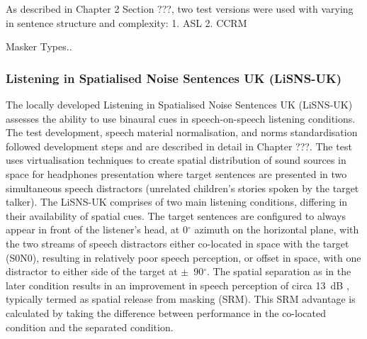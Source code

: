 \documentclass[a4paper, twoside]{templates/ociamthesis}
\begin{document}
As described in Chapter 2 Section ???, two test versions were used with varying in sentence structure and complexity: 1. ASL 2. CCRM

Masker Types..

\hypertarget{listening-in-spatialised-noise-sentences-uk-lisns-uk}{%
\subsubsection{Listening in Spatialised Noise Sentences UK (LiSNS-UK)}\label{listening-in-spatialised-noise-sentences-uk-lisns-uk}}

The locally developed Listening in Spatialised Noise Sentences UK (LiSNS-UK) assesses the ability to use binaural cues in speech-on-speech listening conditions. The test development, speech material normalisation, and norms standardisation followed \textcite{Cameron2007} development steps and are described in detail in Chapter ???. The test uses virtualisation techniques to create spatial distribution of sound sources in space for headphones presentation where target sentences \autocite[ASL;][]{MacLeod1990} are presented in two simultaneous speech distractors (unrelated children's stories spoken by the target talker). The LiSNS-UK comprises of two main listening conditions, differing in their availability of spatial cues. The target sentences are configured to always appear in front of the listener's head, at 0\(^{\circ}\) azimuth on the horizontal plane, with the two streams of speech distractors either co-located in space with the target (S0N0), resulting in relatively poor speech perception, or offset in space, with one distractor to either side of the target at \(\pm\)~90\(^{\circ}\). The spatial separation as in the later condition results in an improvement in speech perception of circa 13~dB \autocite{Cameron2011}, typically termed as spatial release from masking (SRM). This SRM advantage is calculated by taking the difference between performance in the co-located condition and the separated condition.
\end{document}
